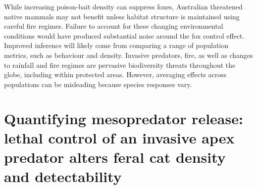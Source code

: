 \documentclass[11pt,a4paper,titlepage,twoside,openright]{style/unimelbthesis}
\begin{document}
\begin{mainmatter}
While increasing poison-bait density can suppress foxes, Australian threatened native mammals may not benefit unless habitat structure is maintained using careful fire regimes. Failure to account for these changing environmental conditions would have produced substantial noise around the fox control effect. Improved inference will likely come from comparing a range of population metrics, such as behaviour and density.
Invasive predators, fire, as well as changes to rainfall and fire regimes are pervasive biodiversity threats throughout the globe, including within protected areas. However, averaging effects across populations can be misleading because species responses vary.

\hypertarget{density}{%
\chapter{Quantifying mesopredator release: lethal control of an invasive apex predator alters feral cat density and detectability}\label{density}}

\hypertarget{abstract-2}{%
}
\end{mainmatter}
\end{document}
